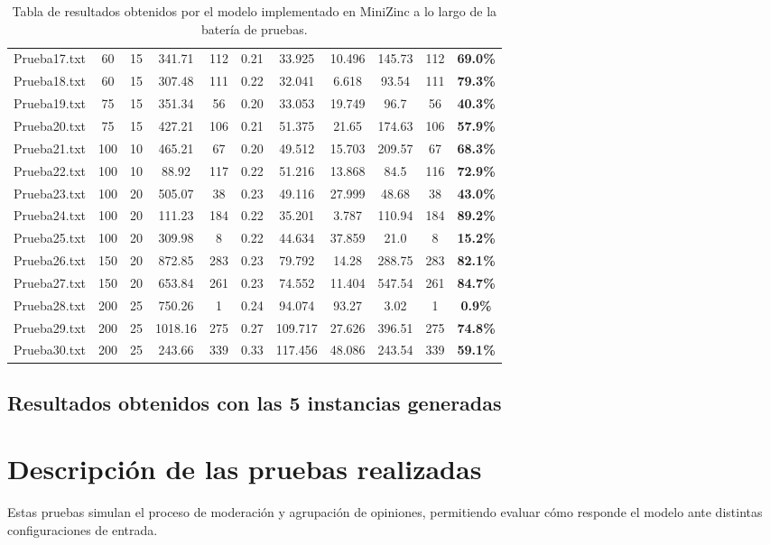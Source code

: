 \documentclass[11pt,letter]{article}
\begin{document}
\begin{table}[H]
{\begin{tabular}{|l|c|c|c|c|c|c|c|c|c|c|}
    Prueba17.txt & 60 & 15 & 341.71 & 112 & 0.21 & 33.925 & 10.496 & 145.73 & 112 & \textbf{69.0\%} \\
    Prueba18.txt & 60 & 15 & 307.48 & 111 & 0.22 & 32.041 & 6.618 & 93.54 & 111 & \textbf{79.3\%} \\
    Prueba19.txt & 75 & 15 & 351.34 & 56 & 0.20 & 33.053 & 19.749 & 96.7 & 56 & \textbf{40.3\%} \\
    Prueba20.txt & 75 & 15 & 427.21 & 106 & 0.21 & 51.375 & 21.65 & 174.63 & 106 & \textbf{57.9\%} \\
    Prueba21.txt & 100 & 10 & 465.21 & 67 & 0.20 & 49.512 & 15.703 & 209.57 & 67 & \textbf{68.3\%} \\
    Prueba22.txt & 100 & 10 & 88.92 & 117 & 0.22 & 51.216 & 13.868 & 84.5 & 116 & \textbf{72.9\%} \\
    Prueba23.txt & 100 & 20 & 505.07 & 38 & 0.23 & 49.116 & 27.999 & 48.68 & 38 & \textbf{43.0\%} \\
    Prueba24.txt & 100 & 20 & 111.23 & 184 & 0.22 & 35.201 & 3.787 & 110.94 & 184 & \textbf{89.2\%} \\
    Prueba25.txt & 100 & 20 & 309.98 & 8 & 0.22 & 44.634 & 37.859 & 21.0 & 8 & \textbf{15.2\%} \\
    Prueba26.txt & 150 & 20 & 872.85 & 283 & 0.23 & 79.792 & 14.28 & 288.75 & 283 & \textbf{82.1\%} \\
    Prueba27.txt & 150 & 20 & 653.84 & 261 & 0.23 & 74.552 & 11.404 & 547.54 & 261 & \textbf{84.7\%} \\
    Prueba28.txt & 200 & 25 & 750.26 & 1 & 0.24 & 94.074 & 93.27 & 3.02 & 1 & \textbf{0.9\%} \\
    Prueba29.txt & 200 & 25 & 1018.16 & 275 & 0.27 & 109.717 & 27.626 & 396.51 & 275 & \textbf{74.8\%} \\
    Prueba30.txt & 200 & 25 & 243.66 & 339 & 0.33 & 117.456 & 48.086 & 243.54 & 339 & \textbf{59.1\%} \\
    \hline
    \end{tabular}
    }
    \caption{Tabla de resultados obtenidos por el modelo implementado en MiniZinc a lo largo de la batería de pruebas.}
\end{table}

\subsection{Resultados obtenidos con las 5 instancias generadas}

\section{Descripción de las pruebas realizadas}
Estas pruebas simulan el proceso de moderación y agrupación de opiniones, permitiendo evaluar cómo responde el modelo ante distintas configuraciones de entrada.
\end{document}
